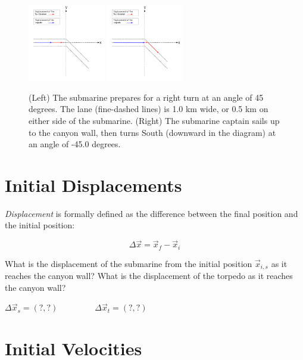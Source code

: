 \documentclass{article}
\begin{document}
\begin{figure}[hb]
\centering
\includegraphics[width=0.3\textwidth]{TheHuntForRedOctober1.pdf}
\includegraphics[width=0.3\textwidth]{TheHuntForRedOctober2.pdf}
\caption{\label{fig:hunt1}  (Left) The submarine prepares for a right turn at an angle of 45 degrees.  The lane (fine-dashed lines) is 1.0 km wide, or 0.5 km on either side of the submarine. (Right) The submarine captain sails up to the canyon wall, then turns South (downward in the diagram) at an angle of -45.0 degrees.}
\end{figure}

\section{Initial Displacements}

\textit{Displacement} is formally defined as the difference between the final position and the initial position:

\begin{equation}
\Delta \vec{x} = \vec{x}_f - \vec{x}_i
\end{equation}

What is the displacement of the submarine from the initial position $\vec{x}_{i,s}$ as it reaches the canyon wall?  What is the displacement of the torpedo as it reaches the canyon wall? \\ \vspace{1cm}

$\Delta \vec{x}_s = (?,?) ~~~~~~~~~~~~~~~~~~~~ \Delta \vec{x}_t = (?,?)$

\section{Initial Velocities}
\end{document}
